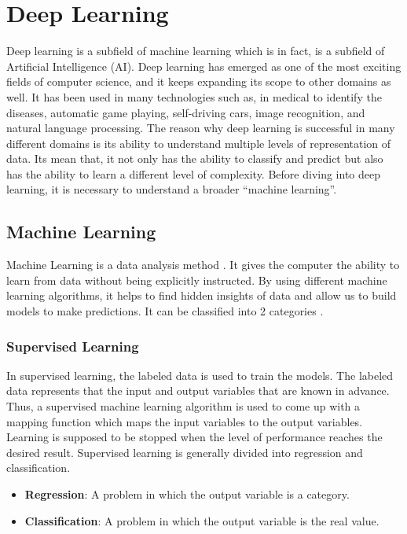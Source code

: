 \chapter{Deep Learning}

Deep learning is a subfield of machine learning which is in fact, is a subfield of Artificial Intelligence (AI). Deep learning has emerged as one of the most exciting fields of computer science, and it keeps expanding its scope to other domains as well. It has been used in many technologies such as, in medical to identify the diseases, automatic game playing, self-driving cars, image recognition, and natural language processing. The reason why deep learning is successful in many different domains is its ability to understand multiple levels of representation of data. Its mean that, it not only has the ability to classify and predict but also has the ability to learn a different level of complexity. Before diving into deep learning, it is necessary to understand a broader ``machine learning''.

\section{Machine Learning}

Machine Learning is a data analysis method \cite{bishop2006pattern}. It gives the computer the ability to learn from data without being explicitly instructed. By using different machine learning algorithms, it helps to find hidden insights of data and allow us to build models to make predictions. It can be classified into 2 categories \cite{machinelearningmastery}.


\subsection{Supervised Learning}

In supervised learning, the labeled data is used to train the models. The labeled data represents that the input and output variables that are known in advance. Thus, a supervised machine learning algorithm is used to come up with a mapping function which maps the input variables to the output variables. Learning is supposed to be stopped when the level of performance reaches the desired result. Supervised learning is generally divided into regression and classification.
\begin{itemize}
	\item \textbf{Regression}: A problem in which the output variable is a category.
	\item \textbf{Classification}: A problem in which the output variable is the real value.
\end{itemize}

